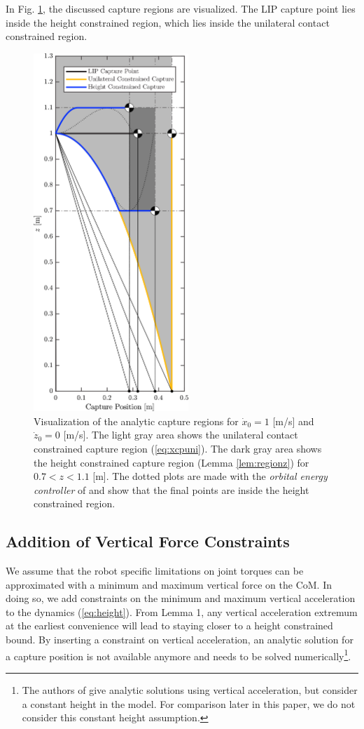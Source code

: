 \documentclass[letterpaper, 10 pt, conference]{ieeeconf}  %
\begin{document}
In Fig. \ref{fig:capregion}, the discussed capture regions are visualized. The LIP capture point lies inside the height constrained region, which lies inside the unilateral contact constrained region.
\begin{figure}
      \centering
      \includegraphics[width=2.3in]{CPLimitsDark.png}
      \caption{Visualization of the analytic capture regions for $\dot{x}_0=1$ [m/s] and $\dot{z}_0=0$ [m/s]. The light gray area shows the unilateral contact constrained capture region (\ref{eq:xcpuni}). The dark gray area shows the height constrained capture region (Lemma \ref{lem:regionz})  for $0.7<z<1.1$ [m]. The dotted plots are made with the \textit{orbital energy controller} of \cite{koolen2016balance} and show that the final points are inside the height constrained region.}
      \label{fig:capregion}
\end{figure}

\subsection{Addition of Vertical Force Constraints}\label{forcecapture}
 We assume that the robot specific limitations on joint torques can be approximated with a minimum and maximum vertical force on the CoM. In doing so, we add constraints on the minimum and maximum vertical acceleration to the dynamics (\ref{eq:height}). From Lemma 1, any vertical acceleration extremum at the earliest convenience will lead to staying closer to a height constrained bound. By inserting a constraint on vertical acceleration, an analytic solution for a capture position is not available anymore and needs to be solved numerically\footnote[1]{The authors of \cite{gao2017increase} give analytic solutions using vertical acceleration, but consider a constant height in the model. For comparison later in this paper, we do not consider this constant height assumption.}.
     
\end{document}
